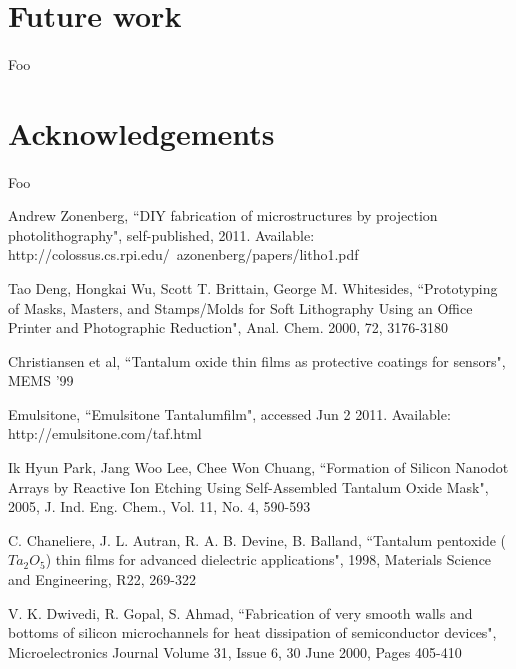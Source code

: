 \documentclass[twocolumn]{article}
\begin{document}
\section{Future work}
\paragraph*{}
Foo

\section{Acknowledgements}
\paragraph*{}
Foo

\begin{thebibliography}{99}
	Andrew Zonenberg, ``DIY fabrication of microstructures by projection photolithography",
	self-published, 2011. Available: http://colossus.cs.rpi.edu/~azonenberg/papers/litho1.pdf

	Tao Deng, Hongkai Wu, Scott T. Brittain, George M. Whitesides, ``Prototyping of Masks, Masters,
	and Stamps/Molds for Soft Lithography Using an Office Printer and Photographic Reduction",
	Anal. Chem. 2000, 72, 3176-3180
	
	Christiansen et al, ``Tantalum oxide thin films as protective coatings for sensors", MEMS '99

	Emulsitone, ``Emulsitone Tantalumfilm", accessed Jun 2 2011. Available:
	http://emulsitone.com/taf.html
	
	Ik Hyun Park, Jang Woo Lee, Chee Won Chuang, ``Formation of Silicon Nanodot Arrays by Reactive
	Ion Etching Using Self-Assembled Tantalum Oxide Mask", 2005, J. Ind. Eng. Chem., Vol. 11, No. 4,
	590-593
	
	C. Chaneliere, J. L. Autran, R. A. B. Devine, B. Balland, ``Tantalum pentoxide ($Ta_2O_5$) thin
	films for advanced dielectric applications", 1998, Materials Science and Engineering, R22,
	269-322
	
	V. K. Dwivedi, R. Gopal, S. Ahmad, ``Fabrication of very smooth walls and bottoms of silicon
	microchannels for heat dissipation of semiconductor devices", Microelectronics Journal
	Volume 31, Issue 6, 30 June 2000, Pages 405-410 

\end{thebibliography}
\end{document}
